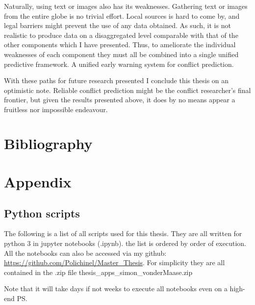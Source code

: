 \documentclass[a4paper]{article}
\begin{document}
Naturally, using text or images also has its weaknesses. Gathering text or images from the entire globe is no trivial effort. Local sources is hard to come by, and legal barriers might prevent the use of any data obtained. As such, it is not realistic to produce data on a disaggregated level comparable with that of the other components which I have presented. Thus, to ameliorate the individual weaknesses of each component they must all be combined into a single unified predictive framework. A unified early warning system for conflict prediction.\par

With these paths for future research presented I conclude this thesis on an optimistic note. Reliable conflict prediction might be the conflict researcher's final frontier, but given the results presented above, it does by no means appear a fruitless nor impossible endeavour.\par


\pagebreak

\section{Bibliography}
 


\pagebreak
\section{Appendix}

\subsection{Python scripts}\label{scripts}

The following is a list of all scripts used for this thesis. They are all written for python 3 in jupyter notebooks (.ipynb). the list is ordered by order of execution. All the notebooks can also be accessed via my github: \hyperlink{https://github.com/Polichinel/Master_Thesis}{https://github.com/Polichinel/Master\_Thesis}. For simplicity they are all contained in the .zip file thesis\_apps\_simon\_vonderMaase.zip

Note that it will take days if not weeks to execute all notebooks even on a high-end PS.\par
\end{document}
